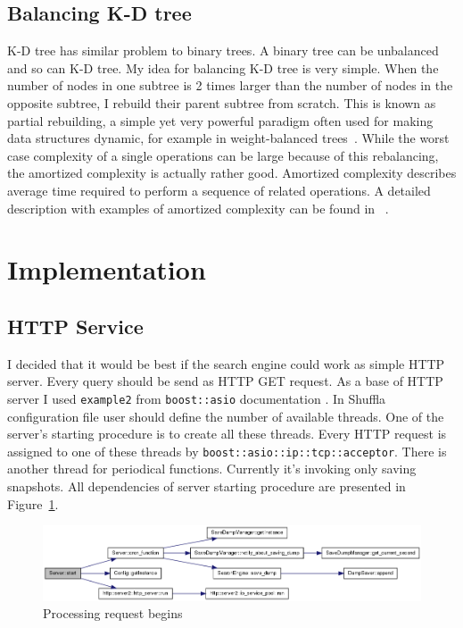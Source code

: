 \documentclass[10pt,a4paper]{article}
\begin{document}
\subsection{Balancing K-D tree}
K-D tree has similar problem to binary trees. A binary tree can be unbalanced and so can K-D tree. My idea for balancing K-D tree is very simple. When the number of nodes in one subtree is 2 times larger than the number of nodes in the opposite subtree, I rebuild their parent subtree from scratch.
This is known as partial rebuilding, a simple yet very powerful paradigm often used for making data structures dynamic, for example in weight-balanced trees~\cite{ALPHATREES}. While the worst case complexity of a single operations can be large because of this rebalancing, the amortized complexity is actually rather good. Amortized complexity describes average time required to perform a sequence of related operations. A detailed description with examples of amortized complexity can be found in ~\cite{AMOR}.

\section{Implementation}
\label{chapter:impl}

\subsection{HTTP Service}

I decided that it would be best if the search engine could work as simple HTTP server. Every query should be send as HTTP GET request. As a base of HTTP server I used \verb|example2| from \verb|boost::asio| documentation \cite{ASIOHTTP}. In Shuffla configuration file user should define the number of available threads. One of the server's starting procedure is to create all these threads. Every HTTP request is assigned to one of these threads by \verb|boost::asio::ip::tcp::acceptor|. There is another thread for periodical functions. Currently it's invoking only saving snapshots. All dependencies of server starting procedure are presented in Figure~\ref{fig:httpservice}.

\begin{figure}[h!]
\centering
  \includegraphics[width=16cm]{start}
  \caption{Processing request begins}
  \label{fig:httpservice}
\end{figure}
\end{document}

